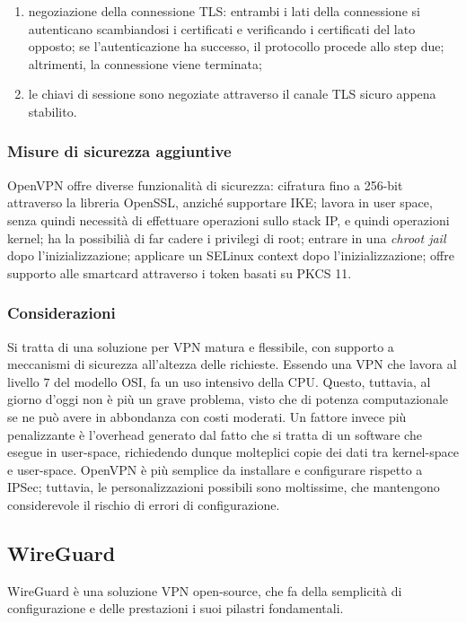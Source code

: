 \begin{enumerate}
    \item negoziazione della connessione TLS: entrambi i lati della connessione si autenticano scambiandosi i certificati e verificando i certificati del lato opposto; se l'autenticazione ha successo, il protocollo procede allo step due; altrimenti, la connessione viene terminata;
    \item le chiavi di sessione sono negoziate attraverso il canale TLS sicuro appena stabilito.
\end{enumerate}


\subsubsection{Misure di sicurezza aggiuntive}
OpenVPN offre diverse funzionalità di sicurezza: cifratura fino a 256-bit attraverso la libreria OpenSSL, anziché supportare IKE; lavora in user space, senza quindi necessità di effettuare operazioni sullo stack IP, e quindi operazioni kernel; ha la possibilià di far cadere i privilegi di root; entrare in una \emph{chroot jail} dopo l'inizializzazione; applicare un SELinux context dopo l'inizializzazione; offre supporto alle smartcard attraverso i token basati su PKCS 11.

\subsubsection{Considerazioni}
Si tratta di una soluzione per VPN matura e flessibile, con supporto a meccanismi di sicurezza all'altezza delle richieste.
Essendo una VPN che lavora al livello $7$ del modello OSI, fa un uso intensivo della CPU. Questo, tuttavia, al giorno d'oggi non è più un grave problema, visto che di potenza computazionale se ne può avere in abbondanza con costi moderati.
Un fattore invece più penalizzante è l'overhead generato dal fatto che si tratta di un software che esegue in user-space, richiedendo dunque molteplici copie dei dati tra kernel-space e user-space.
OpenVPN è più semplice da installare e configurare rispetto a IPSec; tuttavia, le personalizzazioni possibili sono moltissime, che mantengono considerevole il rischio di errori di configurazione.

\subsection{WireGuard}
WireGuard è una soluzione VPN open-source, che fa della semplicità di configurazione e delle prestazioni i suoi pilastri fondamentali.
